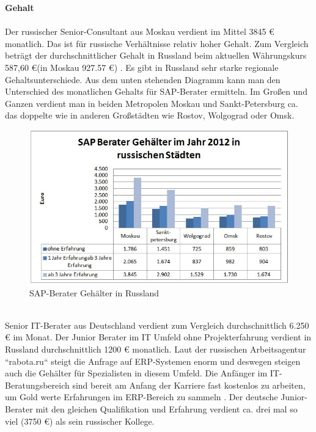 	\textbf{Gehalt}\\ 
	\\
	Der russischer Senior-Consultant aus Moskau verdient im Mittel 3845 € monatlich. Das ist für russische Verhältnisse relativ hoher Gehalt. Zum Vergleich beträgt der durchschnittlicher Gehalt in Russland beim aktuellen Währungskurs 587,60 €(in Moskau 927.57 €) \cite{RusGehAllgm}. Es gibt  in Russland sehr starke regionale Gehaltsunterschiede. Aus dem unten stehenden Diagramm kann man den Unterschied des monatlichen Gehalts für SAP-Berater ermitteln. Im Großen und Ganzen verdient man in beiden Metropolen Moskau und Sankt-Petersburg ca. das doppelte wie in anderen Großstädten wie Rostov, Wolgograd oder Omsk.
	\\
\begin{figure}[htp]
\centering
\includegraphics[width=0.7\linewidth]{./images/SAP-Berater_Gehalt_RU}
\caption{SAP-Berater Gehälter in Russland \cite{GehaltSAPBerRU}}
\label{fig:SAP-Berater_Gehalt_RU}
\end{figure}
\\
	Senior IT-Berater aus Deutschland verdient zum Vergleich durchschnittlich 6.250 € im Monat\cite{GehaltSAPBerDE}. Der Junior Berater im IT Umfeld ohne Projekterfahrung  verdient in Russland durchschnittlich 1200 € monatlich\cite{GehaltSAPBerRU}. Laut der russischen Arbeitsagentur ``rabota.ru`` steigt die Anfrage auf ERP-Systemen enorm und deswegen steigen auch die Gehälter für Spezialisten in diesem Umfeld. Die Anfänger im IT-Beratungsbereich sind bereit am Anfang der Karriere fast kostenlos zu arbeiten, um Gold werte  Erfahrungen im ERP-Bereich zu sammeln \cite{RusGehRabota}.
	Der deutsche Junior-Berater mit den gleichen Qualifikation und Erfahrung verdient ca. drei mal so viel (3750 €) \cite{GehaltSAPBerDE} als sein russischer Kollege.\\ \\

